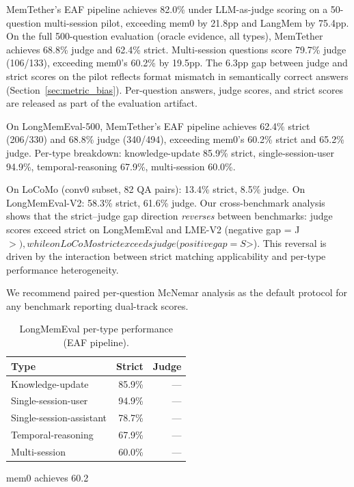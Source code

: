 \documentclass[sigconf,nonacm]{acmart}
\begin{document}
MemTether's EAF pipeline achieves 82.0\% under LLM-as-judge scoring on a 50-question multi-session pilot, exceeding mem0 by 21.8pp and LangMem by 75.4pp. On the full 500-question evaluation (oracle evidence, all types), MemTether achieves 68.8\% judge and 62.4\% strict. Multi-session questions score 79.7\% judge (106/133), exceeding mem0's 60.2\% by 19.5pp. The 6.3pp gap between judge and strict scores on the pilot reflects format mismatch in semantically correct answers (Section~\ref{sec:metric_bias}). Per-question answers, judge scores, and strict scores are released as part of the evaluation artifact.

On LongMemEval-500, MemTether's EAF pipeline achieves 62.4\% strict (206/330) and 68.8\% judge (340/494), exceeding mem0's 60.2\% strict and 65.2\% judge. Per-type breakdown: knowledge-update 85.9\% strict, single-session-user 94.9\%, temporal-reasoning 67.9\%, multi-session 60.0\%.

On LoCoMo (conv0 subset, 82 QA pairs): 13.4\% strict, 8.5\% judge. On LongMemEval-V2: 58.3\% strict, 61.6\% judge. Our cross-benchmark analysis shows that the strict--judge gap direction \emph{reverses} between benchmarks: judge scores exceed strict on LongMemEval and LME-V2 (negative gap = J$>), while on LoCoMo strict exceeds judge (positive gap = S$>). This reversal is driven by the interaction between strict matching applicability and per-type performance heterogeneity.

We recommend paired per-question McNemar analysis as the default protocol for any benchmark reporting dual-track scores.

\begin{table}[h]
\centering
\caption{LongMemEval per-type performance (EAF pipeline).}
\begin{tabular}{lrr}
\toprule
Type & Strict & Judge \\
\midrule
Knowledge-update & 85.9\% & --- \\
Single-session-user & 94.9\% & --- \\
Single-session-assistant & 78.7\% & --- \\
Temporal-reasoning & 67.9\% & --- \\
Multi-session & 60.0\% & --- \\
\bottomrule
\end{tabular}
\end{table}

mem0 achieves 60.2%
\end{document}
